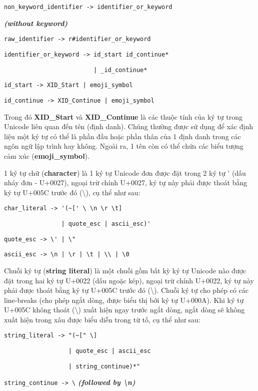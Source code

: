     \verb/non_keyword_identifier -> identifier_or_keyword/

    \hspace*{0pt}\hfill\textbf{\textit{(without keyword)}}

    \verb/raw_identifier -> r#identifier_or_keyword/

    \verb/identifier_or_keyword -> id_start id_continue*/

    \verb/                         | _id_continue*/

    \verb/id_start -> XID_Start | emoji_symbol/

    \verb/id_continue -> XID_Continue | emoji_symbol/

\noindent Trong đó \textbf{XID\_Start} và \textbf{XID\_Continue} là các thuộc tính của ký tự trong Unicode liên quan đến tên (định danh). Chúng thường được sử dụng để xác định liệu một ký tự có thể là phần đầu hoặc phần thân của 1 định danh trong các ngôn ngữ lập trình hay không. Ngoài ra, 1 tên còn có thể chứa các biểu tượng cảm xúc (\textbf{emoji\_symbol}).

    1 ký tự chữ (\textbf{character}) là 1 ký tự Unicode đơn được đặt trong 2 ký tự ' (dấu nháy đơn - U+0027), ngoại trừ chính U+0027, ký tự này phải được thoát bằng ký tự U+005C trước đó (\textbackslash), cụ thể như sau:

    \verb/char_literal -> '(~[' \ \n \r \t]/ 

    \verb/                | quote_esc | ascii_esc)'/

    \verb/quote_esc -> \' | \"/

    \verb/ascii_esc -> \n | \r | \t | \\ | \0/

    Chuỗi ký tự (\textbf{string literal}) là một chuỗi gồm bất kỳ ký tự Unicode nào được đặt trong hai ký tự U+0022 (dấu ngoặc kép), ngoại trừ chính U+0022, ký tự này phải được thoát bằng ký tự U+005C trước đó (\textbackslash). Chuỗi ký tự cho phép có các line-breaks (cho phép ngắt dòng, được biểu thị bởi ký tự U+000A). Khi ký tự U+005C không thoát (\textbackslash) xuất hiện ngay trước ngắt dòng, ngắt dòng sẽ không xuất hiện trong xâu được biểu diễn trong từ tố, cụ thể như sau:

    \verb/string_literal -> "(~[" \]/

    \verb/                  | quote_esc | ascii_esc/

    \verb/                  | string_continue)*"/

    \verb/string_continue -> \/
    \textbf{\textit{(followed by \textbackslash n)}}

